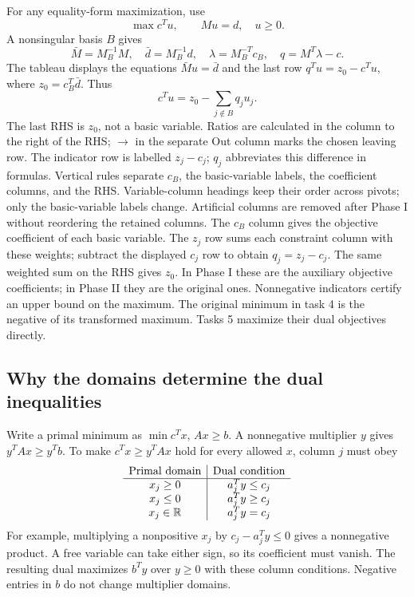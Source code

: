 \documentclass[11pt,a4paper]{article}
\begin{document}
For any equality-form maximization, use
\[
  \max c^Tu,\qquad Mu=d,\quad u\geq0.
\]
A nonsingular basis $B$ gives
\[
  \bar M=M_B^{-1}M,\quad \bar d=M_B^{-1}d,\quad
  \lambda=M_B^{-T}c_B,\quad q=M^T\lambda-c.
\]
The tableau displays the equations $\bar M u=\bar d$ and the last row
$q^Tu=z_0-c^Tu$, where $z_0=c_B^T\bar d$. Thus
\begin{equation}\label{eq:indicator}
  c^Tu=z_0-\sum_{j\notin B}q_ju_j.
\end{equation}
The last RHS is $z_0$, not a basic variable. Ratios are calculated in the column to the right of the RHS;
$\longrightarrow$ in the separate Out column marks the chosen leaving row.
The indicator row is labelled $z_j-c_j$; $q_j$ abbreviates this difference
in formulas. Vertical rules separate $c_B$, the basic-variable labels,
the coefficient columns, and the RHS. Variable-column headings keep their
order across pivots; only the basic-variable labels change. Artificial
columns are removed after Phase I without reordering the retained columns. The $c_B$ column gives the objective coefficient of each basic
variable. The $z_j$ row sums each constraint column with these weights;
subtract the displayed $c_j$ row to obtain $q_j=z_j-c_j$. The same
weighted sum on the RHS gives $z_0$. In Phase I these are the auxiliary
objective coefficients; in Phase II they are the original ones. Nonnegative indicators certify
an upper bound on the maximum. The original minimum in task 4 is the negative
of its transformed maximum. Tasks 5 maximize their dual objectives directly.

\subsection{Why the domains determine the dual inequalities}
Write a primal minimum as $\min c^Tx$, $Ax\geq b$. A nonnegative multiplier
$y$ gives $y^TAx\geq y^Tb$. To make $c^Tx\geq y^TAx$ hold for every allowed $x$,
column $j$ must obey
\[
  \begin{array}{c|c}
    \text{Primal domain}&\text{Dual condition}\\\hline
    x_j\geq0&a_j^Ty\leq c_j\\
    x_j\leq0&a_j^Ty\geq c_j\\
    x_j\in\mathbb{R}&a_j^Ty=c_j
  \end{array}
\]
For example, multiplying a nonpositive $x_j$ by $c_j-a_j^Ty\leq0$ gives a
nonnegative product. A free variable can take either sign, so its coefficient
must vanish. The resulting dual maximizes $b^Ty$ over $y\geq0$ with these
column conditions. Negative entries in $b$ do not change multiplier domains.
\end{document}
